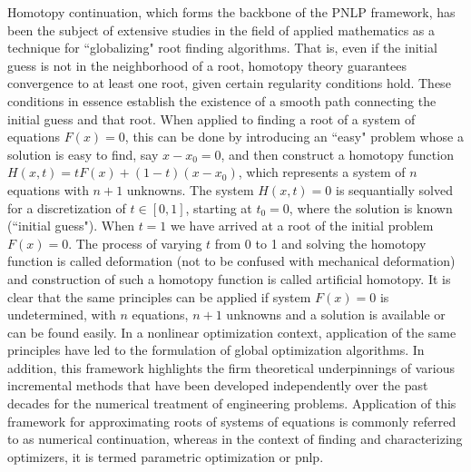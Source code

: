 Homotopy continuation, which forms the backbone of the PNLP framework, has been 
the subject of extensive studies in the field of applied 
mathematics\cite{Allgower:2003,Rheinboldt:2000,Keller:1978,Li:1980,Chow:1978,Chow:1979,
Watson:1989,Watson:1990,Allgower:1981,Rheinboldt:1980,Rheinboldt:1983,Wayburn:1987}
as a technique for ``globalizing" root finding 
algorithms. That is, even if the initial guess is not in the neighborhood of a 
root, homotopy theory guarantees convergence to at least one root, given 
certain regularity conditions hold. These conditions in essence establish the 
existence of a smooth path connecting the initial guess and that root.  When 
applied to finding a root of a system of equations $F(x)=0$, this can be done 
by introducing an ``easy" problem whose a solution is easy to find, say 
$x-x_0=0$, and then construct a homotopy function $H(x,t) = 
tF(x)+(1-t)(x-x_0)$, 
which represents a system of $n$ equations with $n+1$ unknowns. The system  
$H(x,t)=0$ is sequantially solved for a discretization of $t\in[0,1]$, starting 
at $t_0=0$, where the solution is known (``initial guess"). When $t=1$ we have 
arrived at a root of the initial problem $F(x)=0$. The process of varying $t$ 
from 0 to 1 and solving the homotopy function is called deformation (not to be 
confused with mechanical deformation) and construction of such a homotopy 
function is called artificial homotopy.  It is clear that the same principles 
can be applied if system $F(x)=0$ is undetermined, with $n$ equations, $n+1$ 
unknowns and a solution is available or can be found easily. In a nonlinear 
optimization context, application of the same principles have led to the 
formulation of global optimization 
algorithms\cite{Kojima:1984,Gfrerer:1985,Guddat:1990,Gfrerer:1983,Zangwill:1981,Poore:1990,
Jongen:1990,Tiahrt:1989}. In addition, this 
framework highlights the firm theoretical
underpinnings of various incremental methods that
have been developed independently over the past decades for the numerical 
treatment 
of engineering 
problems\cite{Crisfield3,Wempner:1971,Bergan:1978,Bergan:1978b,Batoz:1979,Riks:1979,
Ramm:1981,Watson:1985,Sideris:2017,Byrne:1985,Ushida:1984,Borkovsky:2010,Besanko:2010,
Herings:2010,Bartovn:2016,Barendrecht:2018}. Application of this framework for 
approximating roots 
of systems of equations is commonly referred to as numerical continuation, 
whereas in the context of finding and characterizing optimizers, it is termed 
parametric 
optimization or \acrshort{pnlp}.
  
